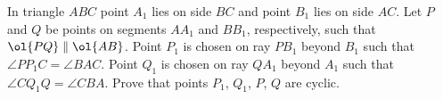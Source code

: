 In triangle $ABC$ point $A_1$ lies on side $BC$
and point $B_1$ lies on side $AC$.
Let $P$ and $Q$ be points on segments $AA_1$ and $BB_1$,
respectively, such that $\ol{PQ} \parallel \ol{AB}$.
Point $P_1$ is chosen on ray $PB_1$ beyond $B_1$
such that $\angle PP_1C = \angle BAC$.
Point $Q_1$ is chosen on ray $QA_1$ beyond $A_1$
such that $\angle CQ_1Q = \angle CBA$.
Prove that points $P_1$, $Q_1$, $P$, $Q$ are cyclic.